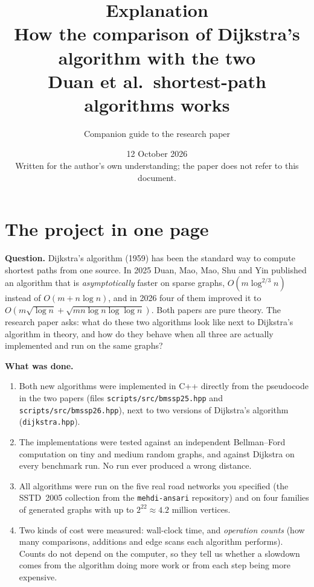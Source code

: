 \documentclass[11pt,a4paper]{article}
\title{Explanation\\[4pt]\large How the comparison of Dijkstra's algorithm with the two\\ Duan et al.\ shortest-path algorithms works}
\author{Companion guide to the research paper}
\date{12 October 2026\\[6pt]\normalsize Written for the author's own understanding; the paper does not refer to this document.}
\newcommand{\code}[1]{\texttt{#1}}
\begin{document}
\maketitle
\tableofcontents
\newpage

\section{The project in one page}
\textbf{Question.} Dijkstra's algorithm (1959) has been the standard way to compute shortest paths from one source. In 2025 Duan, Mao, Mao, Shu and Yin published an algorithm that is \emph{asymptotically} faster on sparse graphs, $O(m\log^{2/3}n)$ instead of $O(m+n\log n)$, and in 2026 four of them improved it to $O(m\sqrt{\log n}+\sqrt{mn\log n\log\log n})$. Both papers are pure theory. The research paper asks: what do these two algorithms look like next to Dijkstra's algorithm in theory, and how do they behave when all three are actually implemented and run on the same graphs?

\textbf{What was done.}
\begin{enumerate}
\item Both new algorithms were implemented in C++ directly from the pseudocode in the two papers (files \code{scripts/src/bmssp25.hpp} and \code{scripts/src/bmssp26.hpp}), next to two versions of Dijkstra's algorithm (\code{dijkstra.hpp}).
\item The implementations were tested against an independent Bellman--Ford computation on \ValSmallTrials{} tiny and \ValMediumTrials{} medium random graphs, and against Dijkstra on every benchmark run. No run ever produced a wrong distance.
\item All algorithms were run on the five real road networks you specified (the SSTD~2005 collection from the \code{mehdi-ansari} repository) and on four families of generated graphs with up to $2^{22}\approx 4.2$ million vertices.
\item Two kinds of cost were measured: wall-clock time, and \emph{operation counts} (how many comparisons, additions and edge scans each algorithm performs). Counts do not depend on the computer, so they tell us whether a slowdown comes from the algorithm doing more work or from each step being more expensive.
\end{enumerate}
\end{document}
